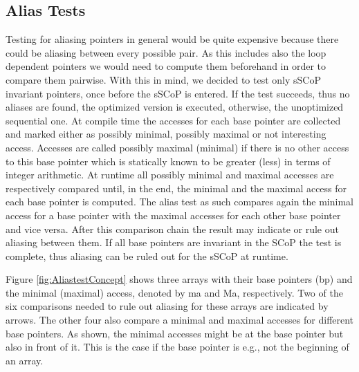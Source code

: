 \subsection{Alias Tests}
Testing for aliasing pointers in general would be quite expensive because 
there could be aliasing between every possible pair. As this includes
also the loop dependent pointers we would need to compute them beforehand in order 
to compare them pairwise. With this in mind, we decided to test only sSCoP
invariant pointers, once before the sSCoP is entered. 
If the test succeeds, thus no aliases are found, the optimized version
is executed, otherwise, the unoptimized sequential one. 
At compile time the accesses for each base pointer are collected and
marked either as possibly minimal, possibly maximal or not interesting access. 
Accesses are called possibly maximal (minimal) if there is no other access to this base 
pointer which is statically known to be greater (less) in terms of integer arithmetic. 
At runtime all possibly minimal and maximal accesses are respectively compared until,
in the end, the minimal and the maximal access for each base pointer is computed.
The alias test as such compares again the minimal access for a base pointer with the maximal 
accesses for each other base pointer and vice versa. After this comparison chain the 
result may indicate or rule out aliasing between them. 
If all base pointers are invariant in the SCoP the test is complete,
thus aliasing can be ruled out for the sSCoP at runtime. 



Figure \ref{fig:AliastestConcept} shows three arrays with their base pointers 
(bp) and the minimal (maximal) access, denoted by ma and Ma, respectively. 
Two of the six comparisons needed to rule out aliasing for these arrays  
are indicated by arrows. The other four also compare a minimal
and maximal accesses for different base pointers. 
As shown, the minimal accesses might be at the base pointer but also in front of it.
This is the case if the base pointer is e.g., not the beginning of an array.

